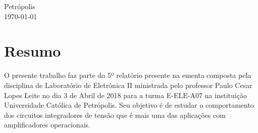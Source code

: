\documentclass[11pt]{article}
\begin{document}
\begin{titlepage}
	
	
	\vfill\vfill\vfill %
	Petrópolis\\
	{\large\today} %
	
	
	 
	
	\vfill %
	
\end{titlepage}
\newpage


\section{Resumo}
O presente trabalho faz parte do 5º relatório presente na ementa composta pela disciplina de Laboratório de Eletrônica II ministrada pelo professor  Paulo Cesar Lopes Leite no dia 3 de Abril de 2018 
para a turma E-ELE-A07 na instituição 
Universidade Católica de Petrópolis. Seu objetivo é de estudar o comportamento dos circuitos integradores de tensão que é mais uma das aplicações com amplificadores operacionais.
\end{document}
